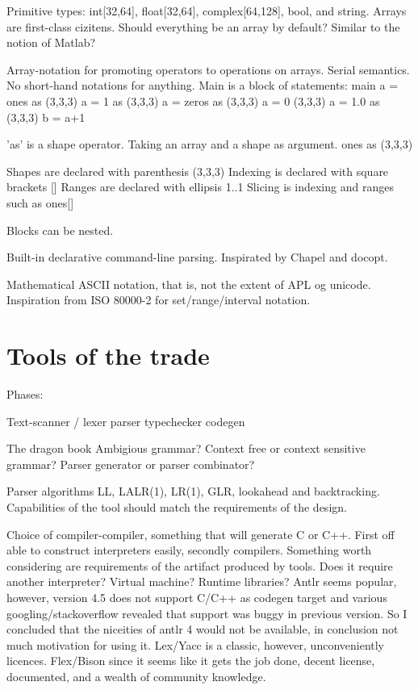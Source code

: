 \documentclass{sigplanconf}
\begin{document}
Primitive types: int[32,64], float[32,64], complex[64,128], bool, and string.
Arrays are first-class cizitens. Should everything be an array by default? Similar to the notion of Matlab?

Array-notation for promoting operators to operations on arrays.
Serial semantics.
No short-hand notations for anything.
Main is a block of statements:
main {
    a = ones as (3,3,3)
    a = 1 as (3,3,3)
    a = zeros as (3,3,3)
    a = 0 (3,3,3)
    a = 1.0 as (3,3,3)
    b = a+1
}

'as' is a shape operator. Taking an array and a shape as argument.
ones as (3,3,3)

Shapes are declared with parenthesis (3,3,3)
Indexing is declared with square brackets []
Ranges are declared with ellipsis 1..1
Slicing is indexing and ranges such as ones[]

Blocks can be nested.

Built-in declarative command-line parsing. Inspirated by Chapel and docopt.

Mathematical ASCII notation, that is, not the extent of APL og unicode.
Inspiration from ISO 80000-2 for set/range/interval notation.

\section{Tools of the trade}

Phases:

Text-scanner / lexer
parser
typechecker
codegen


The dragon book
Ambigious grammar?
Context free or context sensitive grammar?
Parser generator or parser combinator?

Parser algorithms LL, LALR(1), LR(1), GLR, lookahead and backtracking.
Capabilities of the tool should match the requirements of the design.

Choice of compiler-compiler, something that will generate C or C++. First off able to construct interpreters easily, secondly compilers. Something worth considering are requirements of the artifact produced by tools. Does it require another interpreter? Virtual machine? Runtime libraries?  Antlr\cite{cc:antlr} seems popular, however, version 4.5 does not support C/C++ as codegen target and various googling/stackoverflow revealed that support was buggy in previous version. So I concluded that the niceities of antlr 4 would not be available, in conclusion not much motivation for using it. Lex\cite{cc:lex}/Yacc\cite{cc:yacc} is a classic, however, unconveniently licences. Flex/Bison since it seems like it gets the job done, decent license, documented, and a wealth of community knowledge.
\end{document}
